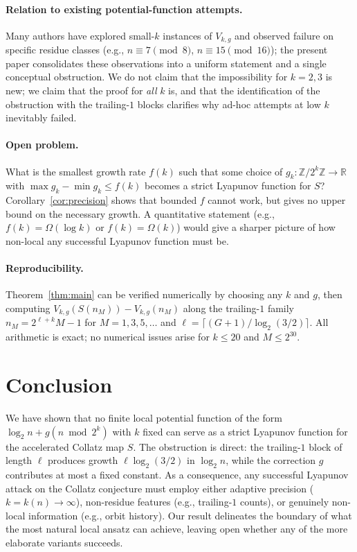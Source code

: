 \documentclass[11pt,a4paper]{article}
\theoremstyle{definition}
\theoremstyle{remark}
\newcommand{\Z}{\mathbb{Z}}
\newcommand{\R}{\mathbb{R}}
\begin{document}
\paragraph{Relation to existing potential-function attempts.}
Many authors have explored small-$k$ instances of $V_{k, g}$ and
observed failure on specific residue classes (e.g., $n \equiv 7
\pmod 8$, $n \equiv 15 \pmod{16}$); the present paper consolidates
these observations into a uniform statement and a single conceptual
obstruction.  We do not claim that the impossibility for $k = 2, 3$
is new; we claim that the proof for \emph{all} $k$ is, and that the
identification of the obstruction with the trailing-$1$ blocks
clarifies why ad-hoc attempts at low $k$ inevitably failed.

\paragraph{Open problem.}
What is the smallest growth rate $f(k)$ such that some choice of
$g_k \colon \Z / 2^k \Z \to \R$ with $\max g_k - \min g_k \leq f(k)$
becomes a strict Lyapunov function for $S$?
Corollary~\ref{cor:precision} shows that bounded $f$ cannot work, but
gives no upper bound on the necessary growth.  A quantitative
statement (e.g., $f(k) = \Omega(\log k)$ or $f(k) = \Omega(k)$) would
give a sharper picture of how non-local any successful Lyapunov
function must be.

\paragraph{Reproducibility.}
Theorem~\ref{thm:main} can be verified numerically by choosing any
$k$ and $g$, then computing $V_{k, g}(S(n_M)) - V_{k, g}(n_M)$ along
the trailing-$1$ family $n_M = 2^{\ell + k} M - 1$ for $M = 1, 3, 5,
\dots$ and $\ell = \lceil (G + 1) / \log_2(3/2) \rceil$.  All
arithmetic is exact; no numerical issues arise for $k \leq 20$ and
$M \leq 2^{30}$.

\section{Conclusion}

We have shown that no finite local potential function of the form
$\log_2 n + g(n \bmod 2^k)$ with $k$ fixed can serve as a strict
Lyapunov function for the accelerated Collatz map $S$.  The obstruction
is direct: the trailing-$1$ block of length $\ell$ produces growth
$\ell \log_2(3/2)$ in $\log_2 n$, while the correction $g$ contributes
at most a fixed constant.  As a consequence, any successful Lyapunov
attack on the Collatz conjecture must employ either adaptive precision
($k = k(n) \to \infty$), non-residue features (e.g., trailing-$1$
counts), or genuinely non-local information (e.g., orbit history).
Our result delineates the boundary of what the most natural local
ansatz can achieve, leaving open whether any of the more elaborate
variants succeeds.
\end{document}
